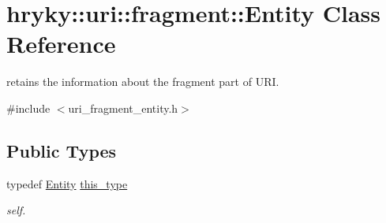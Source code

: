 \hypertarget{classhryky_1_1uri_1_1fragment_1_1_entity}{\section{hryky\-:\-:uri\-:\-:fragment\-:\-:Entity Class Reference}
\label{classhryky_1_1uri_1_1fragment_1_1_entity}
}


retains the information about the fragment part of U\-R\-I.  




{\ttfamily \#include $<$uri\-\_\-fragment\-\_\-entity.\-h$>$}

\subsection*{Public Types}
\begin{DoxyCompactItemize}
\item 
\hypertarget{classhryky_1_1uri_1_1fragment_1_1_entity_a1432f388492da6f28248b977b9402102}{typedef \hyperlink{classhryky_1_1uri_1_1fragment_1_1_entity}{Entity} \hyperlink{classhryky_1_1uri_1_1fragment_1_1_entity_a1432f388492da6f28248b977b9402102}{this\-\_\-type}}\label{classhryky_1_1uri_1_1fragment_1_1_entity_a1432f388492da6f28248b977b9402102}

\begin{DoxyCompactList}\small\item\em self. \end{DoxyCompactList}\end{DoxyCompactItemize}
